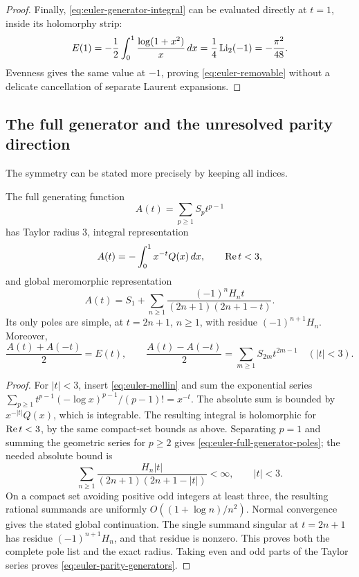 \begin{proof}
Finally, \eqref{eq:euler-generator-integral} can be evaluated directly
at \(t=1\), inside its holomorphy strip:
\[
E(1)=-\frac12\int_0^1\frac{\log(1+x^2)}{x}\,dx
     =\frac14\operatorname{Li}_2(-1)=-\frac{\pi^2}{48}.
\]
Evenness gives the same value at \(-1\), proving
\eqref{eq:euler-removable} without a delicate cancellation of
separate Laurent expansions.
\end{proof}

\subsection{The full generator and the unresolved parity direction}

The symmetry can be stated more precisely by keeping all indices.

\begin{proposition}\label{prop:euler-full-generator}
The full generating function
\[
A(t)=\sum_{p\ge1}S_pt^{p-1}
\]
has Taylor radius \(3\), integral representation
\begin{equation}
A(t)=-\int_0^1x^{-t}Q(x)\,dx,\qquad \operatorname{Re} t<3,
\label{eq:euler-full-generator-integral}
\end{equation}
and global meromorphic representation
\begin{equation}
A(t)=S_1+\sum_{n\ge1}
 \frac{(-1)^nH_n t}{(2n+1)(2n+1-t)}.
\label{eq:euler-full-generator-poles}
\end{equation}
Its only poles are simple, at \(t=2n+1\), \(n\ge1\), with
residue \((-1)^{n+1}H_n\). Moreover,
\begin{equation}
\frac{A(t)+A(-t)}2=E(t),\qquad
\frac{A(t)-A(-t)}2=\sum_{m\ge1}S_{2m}t^{2m-1}
\quad (|t|<3).
\label{eq:euler-parity-generators}
\end{equation}
\end{proposition}

\begin{proof}
For \(|t|<3\), insert \eqref{eq:euler-mellin} and sum the
exponential series \(\sum_{p\ge1}t^{p-1}(-\log x)^{p-1}/(p-1)!
=x^{-t}\). The absolute sum is bounded by \(x^{-|t|}Q(x)\),
which is integrable. The resulting integral is holomorphic for
\(\operatorname{Re} t<3\), by the same compact-set bounds as above.
Separating \(p=1\) and summing the geometric series for \(p\ge2\)
gives \eqref{eq:euler-full-generator-poles}; the needed absolute
bound is
\[
\sum_{n\ge1}\frac{H_n|t|}{(2n+1)(2n+1-|t|)}<\infty,
\qquad |t|<3.
\]
On a compact set avoiding positive odd integers at least three,
the resulting rational summands are uniformly
\(O((1+\log n)/n^2)\). Normal convergence gives the stated global
continuation. The single summand singular at \(t=2n+1\) has residue
\((-1)^{n+1}H_n\), and that residue is nonzero. This proves both
the complete pole list and the exact radius. Taking even and odd
parts of the Taylor series proves \eqref{eq:euler-parity-generators}.
\end{proof}

